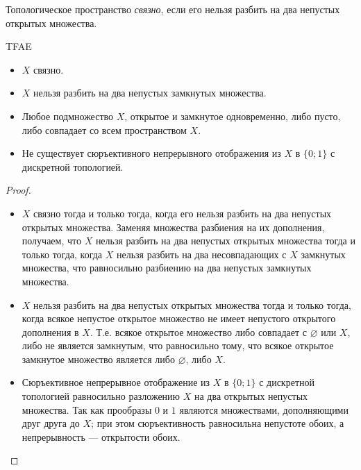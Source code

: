 \documentclass[12pt,a4paper]{article}
\begin{document}
    \begin{definition}
        Топологическое пространство \emph{связно}, если его нельзя разбить на два непустых открытых множества.
    \end{definition}

    \begin{theorem}
        TFAE
        \begin{itemize}
            \item $X$ связно.
            \item $X$ нельзя разбить на два непустых замкнутых множества.
            \item Любое подмножество $X$, открытое и замкнутое одновременно, либо пусто, либо совпадает со всем пространством $X$.
            \item Не существует сюръективного непрерывного отображения из $X$ в $\{0; 1\}$ с дискретной топологией.
        \end{itemize}
    \end{theorem}

    \begin{proof}
        \begin{itemize}
            \item $X$ связно тогда и только тогда, когда его нельзя разбить на два непустых открытых множества. Заменяя множества разбиения на их дополнения, получаем, что $X$ нельзя разбить на два непустых открытых множества тогда и только тогда, когда $X$ нельзя разбить на два несовпадающих с $X$ замкнутых множества, что равносильно разбиению на два непустых замкнутых множества.

            \item $X$ нельзя разбить на два непустых открытых множества тогда и только тогда, когда всякое непустое открытое множество не имеет непустого открытого дополнения в $X$. Т.е. всякое открытое множество либо совпадает с $\varnothing$ или $X$, либо не является замкнутым, что равносильно тому, что всякое открытое замкнутое множество является либо $\varnothing$, либо $X$.

            \item Сюръективное непрерывное отображение из $X$ в $\{0; 1\}$ с дискретной топологией равносильно разложению $X$ на два открытых непустых множества. Так как прообразы $0$ и $1$ являются множествами, дополняющими друг друга до $X$; при этом сюръективность равносильна непустоте обоих, а непрерывность --- открытости обоих.
        \end{itemize}
    \end{proof}
\end{document}

